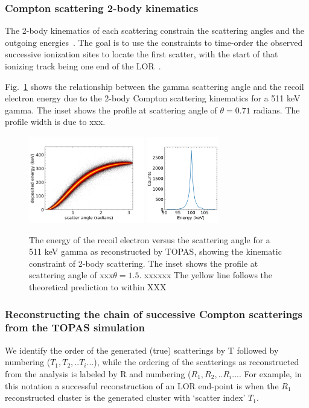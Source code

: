 \documentclass[12pt]{article}
\begin{document}
\subsubsection{Compton scattering 2-body kinematics}
 The 2-body kinematics
of each scattering constrain the scattering angles and the outgoing
energies~\cite{PET_NIM_paper}. The goal is to use the constraints to
time-order the observed successive ionization sites to locate the first
scatter, with the start of that ionizing track being one end of the
LOR~\cite{PET_NIM_paper}.

Fig.~\ref{fig:angle_energy} shows the relationship between the gamma scattering
angle and the recoil electron energy due to the 2-body Compton
scattering kinematics for a 511 keV gamma.  The inset shows the profile at scattering angle of
$\theta=0.71$ radians.  The profile width is due to xxx.

\begin{figure}[!ht]
\centering
\includegraphics[width=0.45\textwidth]{Figures/compton_snake_v1.png}
\hfil
\includegraphics[width=0.28\textwidth]{Figures/compton_slice_v1.png}
\caption{The energy of the recoil electron versus the scattering angle for a 511 keV gamma as reconstructed by TOPAS, showing the kinematic constraint of 2-body scattering. The inset shows the profile at scattering angle of xxx$\theta=1.5$. xxxxxx The yellow line follows the theoretical prediction to within XXX}
\label{fig:angle_energy}
\end{figure}


\subsubsection{Reconstructing the chain of successive Compton scatterings from the TOPAS simulation}
We identify the order of the generated (true) scatterings by T followed by
numbering ($T_1,T_2,..T_i...$), while the ordering of the scatterings as reconstructed from
the analysis is labeled by R and numbering ($R_1,R_2,..R_i...$.
For example, in this notation a successful
reconstruction of an LOR end-point is when the $R_1$ reconstructed
cluster is the generated cluster with `scatter index' $T_1$.
\end{document}
